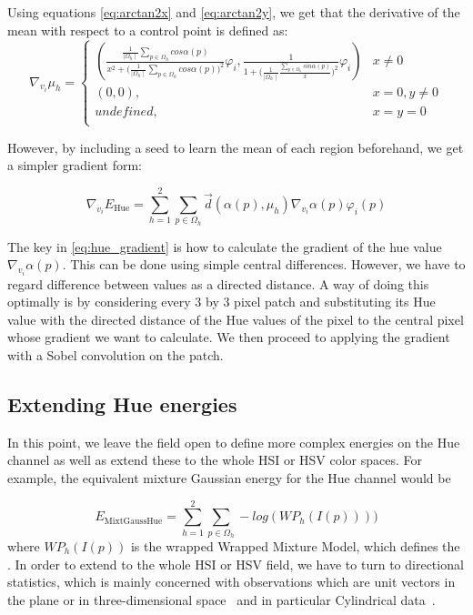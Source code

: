 Using equations \eqref{eq:arctan2x} and \eqref{eq:arctan2y}, we get that the derivative of the mean with respect to a control point is defined as:
\begin{equation}
\nabla_{v_i} \mu_{h} =
\begin{cases}
\left(
\frac{\frac{1}{\mid \Omega_h\mid}\sum_{p\in \Omega_h} cos\alpha(p)}{x^2+\bigl(\frac{1}{\mid \Omega_h\mid}\sum_{p\in \Omega_h} cos\alpha(p)\bigr)^2}\varphi_i,  
\frac{1}{1+\bigl(\frac{1}{\mid \Omega_h\mid}\frac{\sum_{p\in \Omega_h} sin\alpha(p)}{x}\bigr)^2}\varphi_i
\right)  & x\neq 0 \\
(0,0),  & x=0, y\neq 0 \\
undefined, & x=y=0\\
\end{cases}
\end{equation}

However, by including a seed to learn the mean of each region beforehand, we get a simpler gradient form: 

\begin{equation}\label{eq:hue_gradient}
\nabla_{v_i}E_{\mathrm{Hue}} = \sum\limits_{h=1}^2\sum_{p\in \Omega_h} \vec{d}(\alpha(p),\mu_h)\nabla_{v_i}\alpha(p)\varphi_i(p)
\end{equation}

The key in \eqref{eq:hue_gradient} is how to calculate the gradient of the hue value $\nabla_{v_i}\alpha(p)$.  This can be done using simple central differences. However, we have to regard difference between values as a directed distance. A way of doing this optimally is by considering every 3 by 3 pixel patch and substituting its Hue value with the directed distance of the Hue values of the pixel to the central pixel whose gradient we want to calculate. We then proceed to applying the gradient with a Sobel convolution on the patch. 



\subsection{Extending Hue energies}
\label{subsec:extending_to_hsi}

In this point, we leave the field open to define more complex energies on the Hue channel as well as extend these to the whole HSI or HSV color spaces. For example, the equivalent mixture Gaussian energy for the Hue channel would be

\begin{equation}
E_{\mathrm{MixtGaussHue}}=\sum\limits_{h =1}^{2} \sum_{p \in \Omega_h} -log(WP_h(I(p))))
\end{equation}
where $WP_h(I(p))$ is the wrapped Wrapped Mixture Model, which defines the . In order to extend to the whole HSI or HSV field, we have to turn to directional statistics, which is mainly concerned with observations which are unit vectors in the plane or in three-dimensional space~\cite{directionalStatistics} and in particular Cylindrical data~\cite{cylindrical_data}.